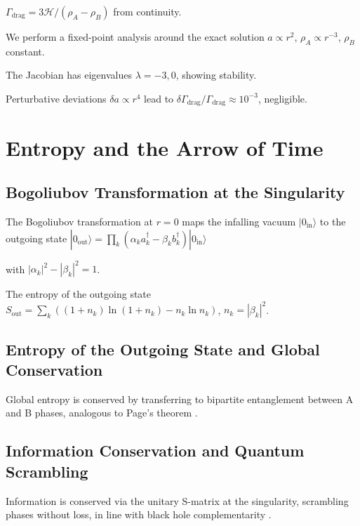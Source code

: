 \documentclass[10pt,twocolumn]{article}
\theoremstyle{definition}
\newcommand{\rhoA}{\rho_{A}}
\newcommand{\rhoB}{\rho_{B}}
\newcommand{\Hcal}{\mathcal{H}}
\newcommand{\Gammadrag}{\Gamma_{\mathrm{drag}}}
\begin{document}
\( \Gammadrag = 3 \Hcal / (\rhoA - \rhoB) \) from continuity.
\label{eq:Gamma-drag}

We perform a fixed-point analysis around the exact solution \( a \propto r^{2} \), \( \rhoA \propto r^{-3} \), \( \rhoB \) constant.

The Jacobian has eigenvalues \( \lambda = -3, 0 \), showing stability.

Perturbative deviations \( \delta a \propto r^{4} \) lead to \( \delta \Gammadrag / \Gammadrag \approx 10^{-3} \), negligible.

\section{Entropy and the Arrow of Time}
\label{sec:entropy}

\subsection{Bogoliubov Transformation at the Singularity}

The Bogoliubov transformation at \( r=0 \) maps the infalling vacuum \( |0_{\mathrm{in}}\rangle \) to the outgoing state \( |0_{\mathrm{out}}\rangle = \prod_{k} (\alpha_{k} a_{k}^{\dagger} - \beta_{k} b_{k}^{\dagger}) |0_{\mathrm{in}}\rangle \)

with \( |\alpha_{k}|^{2} - |\beta_{k}|^{2} = 1 \).

The entropy of the outgoing state \( S_{\mathrm{out}} = \sum_{k} ( (1 + n_{k}) \ln(1 + n_{k}) - n_{k} \ln n_{k} ) \), \( n_{k} = |\beta_{k}|^{2} \).

\subsection{Entropy of the Outgoing State and Global Conservation}

Global entropy is conserved by transferring to bipartite entanglement between A and B phases, analogous to Page's theorem \citep{Page1993}.

\subsection{Information Conservation and Quantum Scrambling}

Information is conserved via the unitary S-matrix at the singularity, scrambling phases without loss, in line with black hole complementarity \citep{Susskind1993}.
\end{document}
